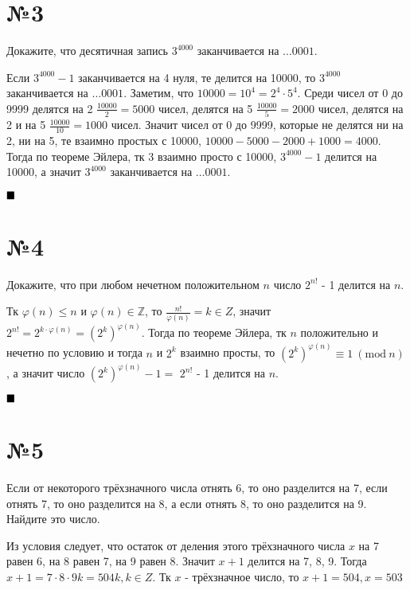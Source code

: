 \documentclass[a4paper, 16pt]{article}
\newcommand{\Z} {\mathbb{Z}}
\newcommand{\Mod}[1]{\ (\mathrm{mod}\ #1)}
\newenvironment{proof}[1][Доказательство]{%
	\begin{trivlist}
		\item[\hskip \labelsep {\bfseries #1:}]
		\item \hspace{14pt}
	}{
		$ \hfill\blacksquare $
	\end{trivlist}
	\hfill\break
}
\newenvironment{solution}[1][Решение]{%
	\begin{trivlist}
		\item[\hskip \labelsep {\bfseries #1:}]
		\item \hspace{15pt}
	}{
	\end{trivlist}
}
\begin{document}
	\section*{№3}
	
		Докажите, что десятичная запись
		$3^{4000}$
		заканчивается на $\dots 0001$.
		
		\begin{proof}
			Если $3^{4000} - 1$ заканчивается на 4 нуля, те делится на 10000, то $3^{4000}$ заканчивается на $\dots 0001$. Заметим, что $10000 = 10^4  =2^4 \cdot 5^4$. Среди чисел от 0 до 9999 делятся на 2 $\frac{10000}{2} = 5000$ чисел, делятся на 5 $\frac{10000}{5} = 2000$ чисел, делятся на 2 и на 5 $\frac{10000}{10} = 1000$ чисел. Значит чисел от 0 до 9999, которые не делятся ни на 2, ни на 5, те взаимно простых с 10000, $10000 - 5000 - 2000 + 1000 = 4000$. Тогда по теореме Эйлера, тк 3 взаимно просто с 10000, $3^{4000} - 1$ делится на 10000, а значит $3^{4000}$ заканчивается на $\dots 0001$.
		\end{proof}
	
	\section*{№4}
	
		Докажите, что при любом нечетном положительном
		$n$
		число
		$2^{n!}$
		-
		1
		делится на
		$n$.
		
		\begin{proof}
			Тк $\varphi (n) \leq n$ и $ \varphi (n)  \in \Z$, то $\frac{n!}{\varphi (n) } = k \in Z$, значит $2^{n!} = 2 ^{k\cdot \varphi(n)} = (2 ^{k})^ {\varphi(n)}$. Тогда по теореме Эйлера, тк $n$ положительно и нечетно по условию и тогда $n$ и $2^k$ взаимно просты, то $(2 ^{k})^ {\varphi(n)} \equiv 1 \Mod{n}$, а значит число $(2 ^{k})^ {\varphi(n)} - 1 = $ 
			$2^{n!}$
			-
			1
			делится на
			$n$.
		\end{proof}
	
	\section*{№5}
	
		Если от некоторого трёхзначного числа отнять 6, то оно разделится на 7, если отнять 7, то оно
		разделится на 8, а если отнять 8, то оно разделится на 9. Найдите это число.
		
		\begin{solution}
			Из условия следует, что остаток от деления этого трёхзначного числа $x$ на 7 равен 6, на 8 равен 7, на 9 равен 8. Значит $x + 1$ делится на 7, 8, 9. Тогда $x + 1 = 7 \cdot 8 \cdot 9 k = 504 k, k \in Z$. Тк $x$ - трёхзначное число, то $x + 1 = 504, x = 503$
		\end{solution}
		
\end{document}
